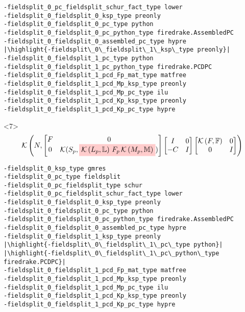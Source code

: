 \documentclass[presentation]{beamer}
\newcommand{\KSP}[2]{\ensuremath{\mathcal{K}\left(#1, \mathbb{#2}\right)}}
\newcommand{\ksp}[1]{\KSP{#1}{#1}}
\newcommand{\highlight}[1]{\colorbox{red!20}{\color{black} #1}}
\begin{document}
\begin{frame}[fragile]
\begin{onlyenv}
\begin{verbatim}
-fieldsplit_0_pc_fieldsplit_schur_fact_type lower
-fieldsplit_0_fieldsplit_0_ksp_type preonly
-fieldsplit_0_fieldsplit_0_pc_type python
-fieldsplit_0_fieldsplit_0_pc_python_type firedrake.AssembledPC
-fieldsplit_0_fieldsplit_0_assembled_pc_type hypre
|\highlight{-fieldsplit\_0\_fieldsplit\_1\_ksp\_type preonly}|
-fieldsplit_0_fieldsplit_1_pc_type python
-fieldsplit_0_fieldsplit_1_pc_python_type firedrake.PCDPC
-fieldsplit_0_fieldsplit_1_pcd_Fp_mat_type matfree
-fieldsplit_0_fieldsplit_1_pcd_Mp_ksp_type preonly
-fieldsplit_0_fieldsplit_1_pcd_Mp_pc_type ilu
-fieldsplit_0_fieldsplit_1_pcd_Kp_ksp_type preonly
-fieldsplit_0_fieldsplit_1_pcd_Kp_pc_type hypre
\end{verbatim}
  \end{onlyenv}
  \begin{onlyenv}<7>
    \color{gray}
    \begin{equation*}
      \KSP{N}{%
        \begin{bmatrix}
        F & 0 \\
        0 & \mathcal{K}(S_p, \highlight{$\KSP{L_p}{L}\,F_p \, \KSP{M_p}{M}$})
      \end{bmatrix}
      \begin{bmatrix}
        I & 0\\
        -C & I
      \end{bmatrix}
      \begin{bmatrix}
        \ksp{F} & 0 \\
        0 & I
      \end{bmatrix}}
    \end{equation*}
\begin{verbatim}
-fieldsplit_0_ksp_type gmres
-fieldsplit_0_pc_type fieldsplit
-fieldsplit_0_pc_fieldsplit_type schur
-fieldsplit_0_pc_fieldsplit_schur_fact_type lower
-fieldsplit_0_fieldsplit_0_ksp_type preonly
-fieldsplit_0_fieldsplit_0_pc_type python
-fieldsplit_0_fieldsplit_0_pc_python_type firedrake.AssembledPC
-fieldsplit_0_fieldsplit_0_assembled_pc_type hypre
-fieldsplit_0_fieldsplit_1_ksp_type preonly
|\highlight{-fieldsplit\_0\_fieldsplit\_1\_pc\_type python}|
|\highlight{-fieldsplit\_0\_fieldsplit\_1\_pc\_python\_type firedrake.PCDPC}|
-fieldsplit_0_fieldsplit_1_pcd_Fp_mat_type matfree
-fieldsplit_0_fieldsplit_1_pcd_Mp_ksp_type preonly
-fieldsplit_0_fieldsplit_1_pcd_Mp_pc_type ilu
-fieldsplit_0_fieldsplit_1_pcd_Kp_ksp_type preonly
-fieldsplit_0_fieldsplit_1_pcd_Kp_pc_type hypre
\end{verbatim}
  \end{onlyenv}

\end{frame}
\end{document}
